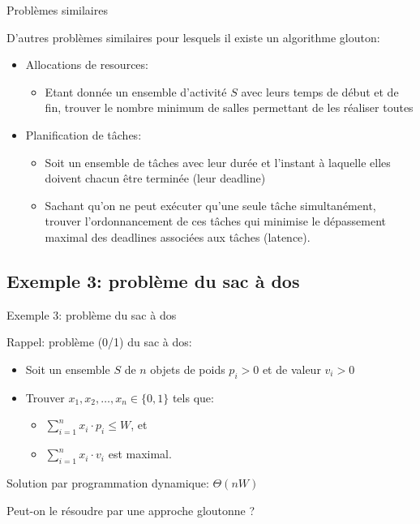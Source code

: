 \begin{frame}{Problèmes similaires}

D'autres problèmes similaires pour lesquels il existe un algorithme glouton:
\begin{itemize}
\item Allocations de resources:
\begin{itemize}
\item Etant donnée un ensemble d'activité $S$ avec leurs temps de début et de fin, trouver le nombre minimum de salles permettant de les réaliser toutes
\end{itemize}

\bigskip

\item Planification de tâches:
\begin{itemize}
\item Soit un ensemble de tâches avec leur durée et l'instant à laquelle elles doivent chacun être terminée (leur deadline)
\item Sachant qu'on ne peut exécuter qu'une seule tâche simultanément,
  trouver l'ordonnancement de ces tâches qui minimise le dépassement maximal des deadlines associées aux tâches (latence).
\end{itemize}
\end{itemize}


\end{frame}

\subsection{Exemple 3: problème du sac à dos}

\begin{frame}{Exemple 3: problème du sac à dos}

Rappel: problème (0/1) du sac à dos:
\begin{itemize}
\item Soit un ensemble $S$ de $n$ objets de poids $p_i>0$ et de valeur $v_i>0$
\item Trouver $x_1, x_2, \ldots, x_n \in \{0,1\}$ tels que:
\begin{itemize}
\item $\sum_{i=1}^n x_i\cdot p_i\leq W$, et
\item $\sum_{i=1}^n x_i\cdot v_i$ est maximal.
\end{itemize}
\end{itemize}

\bigskip

Solution par programmation dynamique: $\Theta(n W)$

\bigskip

Peut-on le résoudre par une approche gloutonne ?



\end{frame}


